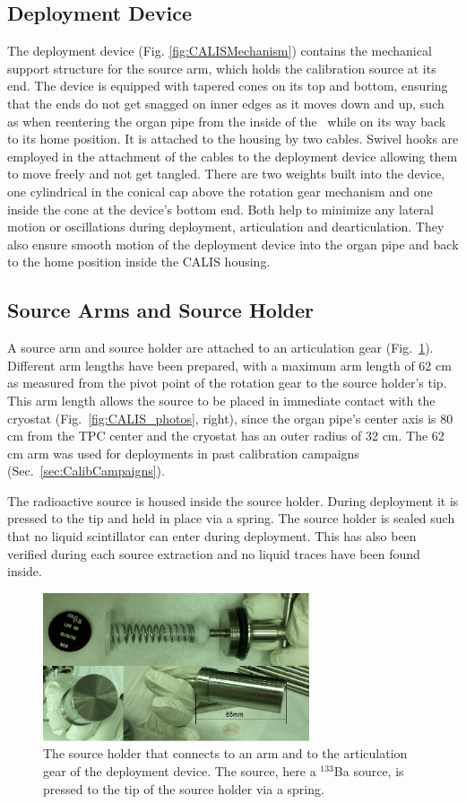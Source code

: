 \subsection{Deployment Device}
The deployment device (Fig. \ref{fig:CALISMechanism}) contains the mechanical support structure for the source arm, which holds the calibration source at its end. The device is equipped with tapered cones on its top and bottom, ensuring that the ends do not get snagged on inner edges as it moves down and up, such as when reentering the organ pipe from the inside of the \lsv\ while on its way back to its home position. It is attached to the housing by two cables. Swivel hooks are employed in the attachment of the cables to the deployment device allowing them to move freely and not get tangled. 
There are two weights built into the device, one cylindrical in the conical cap above the rotation gear mechanism and one inside the cone at the device's bottom end. Both help to minimize any lateral motion or oscillations during deployment, articulation and dearticulation. They also ensure smooth motion of the deployment device into the organ pipe and back to the home position inside the CALIS housing.

\subsection{Source Arms and Source Holder}
A source arm and source holder are attached to an articulation gear (Fig.~\ref{fig:SourceHolder}). Different arm lengths have been prepared, with a maximum arm length of 62 cm as measured from the pivot point of the rotation gear to the source holder's tip. This arm length allows the source to be placed in immediate contact with the cryostat (Fig.~\ref{fig:CALIS_photos}, right), since the organ pipe's center axis is 80 cm from the TPC center and the cryostat has an outer radius of 32 cm. The 62 cm arm was used for deployments in past calibration campaigns (Sec.~\ref{sec:CalibCampaigns}).

The radioactive source is housed inside the source holder. During deployment it is pressed to the tip and held in place via a spring. The source holder is sealed such that no liquid scintillator can enter during deployment. This has also been verified during each source extraction and no liquid traces have been found inside.

\begin{figure}[htbp]
 \centering
  \includegraphics[width=0.7\textwidth]{Figures/SourceHolder.png}
  \caption{The source holder that connects to an arm and to the articulation gear of the deployment device. The source, here a $^{133}$Ba source, is pressed to the tip of the source holder via a spring.}
  \label{fig:SourceHolder}
\end{figure}